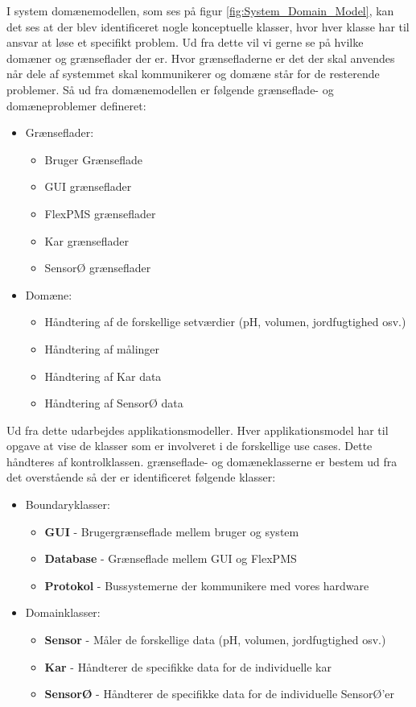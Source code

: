 
I system domænemodellen, som ses på figur \ref{fig:System_Domain_Model}, kan det ses at der blev identificeret nogle konceptuelle klasser, hvor hver klasse har til ansvar at løse et specifikt problem. Ud fra dette vil vi gerne se på hvilke domæner og grænseflader der er. Hvor grænsefladerne er det der skal anvendes når dele af systemmet skal kommunikerer og domæne står for de resterende problemer. Så ud fra domænemodellen er følgende grænseflade- og domæneproblemer defineret:
\begin{itemize}
	\item Grænseflader:
		\begin{itemize}
			\item Bruger Grænseflade
			\item GUI grænseflader
			\item FlexPMS grænseflader 
			\item Kar grænseflader
			\item SensorØ grænseflader
		\end{itemize}
	\item Domæne:
	\begin{itemize}
			\item Håndtering af de forskellige setværdier (pH, volumen, jordfugtighed osv.)
			\item Håndtering af målinger
			\item Håndtering af Kar data 
			\item Håndtering af SensorØ data 
		\end{itemize}
\end{itemize} 

Ud fra dette udarbejdes applikationsmodeller. Hver applikationsmodel har til opgave at vise de klasser som er involveret i de forskellige use cases. Dette håndteres af kontrolklassen. grænseflade- og domæneklasserne er bestem ud fra det overstående så der er identificeret følgende klasser:

\begin{itemize}
	\item Boundaryklasser:
		\begin{itemize}
			\item \textbf{GUI} - Brugergrænseflade mellem bruger og system
			\item \textbf{Database} - Grænseflade mellem GUI og FlexPMS
			\item \textbf{Protokol} - Bussystemerne der kommunikere med vores hardware 
		\end{itemize}
	\item Domainklasser:
	\begin{itemize}
			\item \textbf{Sensor} - Måler de forskellige data (pH, volumen, jordfugtighed osv.)
			\item \textbf{Kar} - Håndterer de specifikke data for de individuelle kar
			\item \textbf{SensorØ} - Håndterer de specifikke data for de individuelle SensorØ'er
	\end{itemize} 
\end{itemize} 
 
